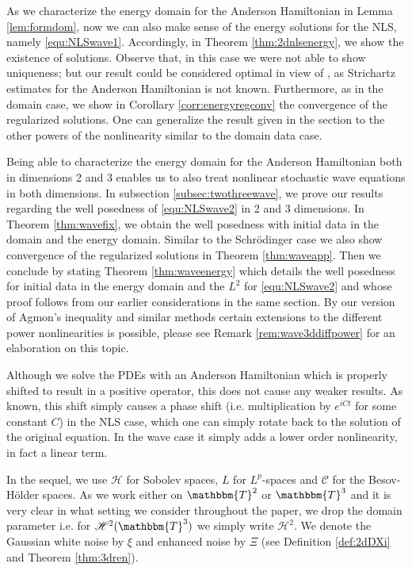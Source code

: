 \documentclass[11pt, oneside]{article}   	%
\begin{document}
As we characterize the energy domain for the Anderson Hamiltonian in Lemma \ref{lem:formdom}, now we can also make sense of the energy solutions for the NLS, namely \eqref{equ:NLSwave1}.  Accordingly, in Theorem \ref{thm:2dnlsenergy}, we show the existence of solutions.  Observe that, in this case we were not able to show uniqueness; but our result could be considered optimal in view of \cite{BGT04}, as Strichartz estimates for the Anderson Hamiltonian is not known.  Furthermore, as in the domain case, we show in Corollary \ref{corr:energyregconv} the convergence of the regularized solutions. One can generalize the result given in the section to the other  powers of the nonlinearity similar to the domain data case. 

Being able to characterize the energy domain for the Anderson Hamiltonian both in dimensions 2 and 3  enables us to also treat nonlinear stochastic wave equations in both dimensions.  In subsection \ref{subsec:twothreewave}, we prove our results regarding the well posedness of \eqref{equ:NLSwave2} in 2 and 3 dimensions.  In Theorem \ref{thm:wavefix}, we obtain the well posedness with initial data in the domain and the energy domain.  Similar to the Schr\"odinger case we also show convergence of the regularized solutions in Theorem \ref{thm:waveapp}.  Then we conclude  by stating Theorem \ref{thm:waveenergy} which details the well posedness for initial data in the energy domain and the $L^2$ for \eqref{equ:NLSwave2} and  whose proof follows from our earlier considerations in the same section.  By our version of Agmon's inequality and similar methods certain extensions to the different power nonlinearities is possible, please see Remark \ref{rem:wave3ddiffpower} for an elaboration on this topic.

Although we solve the PDEs with an Anderson Hamiltonian which is properly shifted to result in a positive operator,  this does not cause any weaker results.  As known, this shift simply causes a phase shift (i.e. multiplication by $e^{iCt}$ for some constant $C$) in the NLS case, which one can simply rotate back to the solution of the original equation.  In the wave case it simply adds a lower order nonlinearity, in fact a linear term.

In the sequel, we use $\mathscr{H}$ for Sobolev spaces, $L$ for $L^p$-spaces and $\mathscr{C}$ for the Besov-H\"older spaces. As we work either on $\mathbbm{T}^2$ or $\mathbbm{T}^3$ and it is very clear in what setting we consider throughout the paper, we drop the domain parameter i.e. for $\mathscr{H}^2(\mathbbm{T}^3)$ we simply write $\mathscr{H}^2$.  We denote the Gaussian white noise by $\xi$ and enhanced noise by $\Xi$ (see Definition \ref{def:2dDXi} and Theorem \ref{thm:3dren}).
\end{document}
